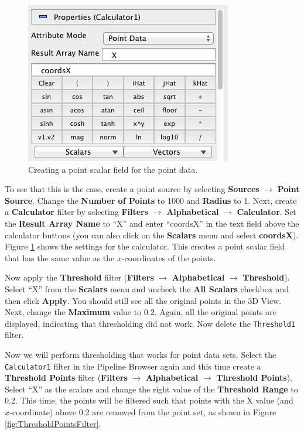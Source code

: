\documentclass[12pt]{article}
\newcommand{\filter}[1]{\textbf{#1}}
\newcommand{\filterinstance}[1]{\texttt{#1}}
\newcommand{\menu}[1]{\textbf{#1}}
\newcommand{\setting}[1]{\textbf{#1}}
\begin{document}
\begin{figure}[htbp]
   \centering
   \includegraphics[scale=.5]{images/ThresholdPointsFilterCalculator.png} %
   \caption{Creating a point scalar field for the point data.}
   \label{fig:ThresholdPointsFilterCalculator}
\end{figure}

To see that this is the case, create a point source by selecting \menu{Sources} $\rightarrow$ \menu {Point Source}. Change the \setting{Number of Points} to 1000 and \setting{Radius} to 1. Next, create a \filter{Calculator} filter by selecting \menu{Filters} $\rightarrow$ \menu{Alphabetical} $\rightarrow$ \menu{Calculator}. Set the \setting{Result Array Name} to ``X'' and enter ``coordsX'' in the text field above the calculator buttons (you can also click on the \menu{Scalars} menu and select \menu{coordsX}). Figure \ref{fig:ThresholdPointsFilterCalculator} shows the settings for the calculator. This creates a point scalar field that has the same value as the $x$-coordinates of the points.

Now apply the \filter{Threshold} filter (\menu{Filters} $\rightarrow$ \menu{Alphabetical} $\rightarrow$ \menu{Threshold}). Select ``X'' from the \setting{Scalars} menu and uncheck the \setting{All Scalars} checkbox and then click \setting{Apply}. You should still see all the original points in the 3D View. Next, change the \setting{Maximum} value to 0.2. Again, all the original points are displayed, indicating that thresholding did not work. Now delete the \filterinstance{Threshold1} filter.

Now we will perform thresholding that works for point data sets. Select the \filterinstance{Calculator1} filter in the Pipeline Browser again and this time create a \filter{Threshold Points} filter (\menu{Filters} $\rightarrow$ \menu{Alphabetical} $\rightarrow$ \menu{Threshold Points}). Select ``X'' as the scalars and change the right value of the \setting{Threshold Range} to 0.2. This time, the points will be filtered such that points with the X value (and $x$-coordinate) above 0.2 are removed from the point set, as shown in Figure \ref{fig:ThresholdPointsFilter}.
\end{document}
